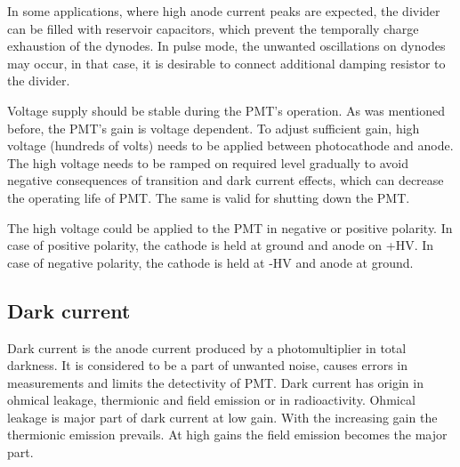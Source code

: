 \par
In some applications, where high anode current peaks are expected, the divider can be filled with reservoir capacitors, which prevent the temporally charge exhaustion of the dynodes. In pulse mode, the unwanted oscillations on dynodes may occur, in that case, it is desirable to connect additional damping resistor to the divider.
\par
Voltage supply should be stable during the PMT's operation. As was mentioned before, the PMT's gain is voltage dependent. To adjust sufficient gain, high voltage (hundreds of volts) needs to be applied between photocathode and anode. The high voltage needs to be ramped on required level gradually to avoid negative consequences of transition and dark current effects, which can decrease the operating life of PMT. The same is valid for shutting down the PMT.
\par
The high voltage could be applied to the PMT in negative or positive polarity. In case of positive polarity, the cathode is held at ground and anode on +HV. In case of negative polarity, the cathode is held at -HV and anode at ground. 

\subsection{Dark current}
Dark current is the anode current produced by a photomultiplier in total darkness. It is considered to be a part of unwanted noise, causes errors in measurements and limits the detectivity of PMT. Dark current has origin in ohmical leakage, thermionic and field emission or in radioactivity. Ohmical leakage is major part of dark current at low gain. With the increasing gain the thermionic emission prevails. At high gains the field emission becomes the major part.

